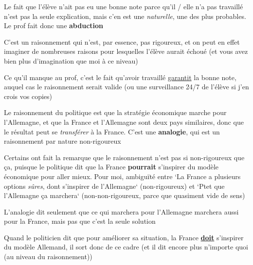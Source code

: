 \begin{frame}

Le fait que l'élève n'ait pas eu une bonne note parce qu'il / elle n'a pas travaillé n'est pas la seule explication, mais c'en est une \textit{naturelle}, une des plus probables. \pause Le prof fait donc une \textbf{abduction}\pause\newline

C'est un raisonnement qui n'est, par essence, pas rigoureux, et on peut en effet imaginer de nombreuses raisons pour lesquelles l'élève aurait échoué (et vous avez bien plus d'imagination que moi à ce niveau)\pause\newline

Ce qu'il manque au prof, c'est le fait qu'avoir travaillé \underline{garantit} la bonne note, auquel cas le raisonnement serait valide \pause (ou une surveillance 24/7 de l'élève si j'en crois vos copies)
\end{frame}

\begin{frame}

Le raisonnement du politique est que la stratégie économique marche pour l'Allemagne, et que la France et l'Allemagne sont deux pays similaires, donc que le résultat peut se \textit{transférer} à la France. \pause C'est une \textbf{analogie}, qui est un raisonnement par nature non-rigoureux\pause\newline

Certains ont fait la remarque que le raisonnement n'est pas si non-rigoureux que ça, puisque le politique dit que la France \textbf{pourrait} s'inspirer du modèle économique pour aller mieux. \pause Pour moi, ambiguïté entre `La France a plusieurs options \textit{sûres}, dont s'inspirer de l'Allemagne` (non-rigoureux) et `Ptet que l'Allemagne ça marchera` (non-non-rigoureux, parce que quasiment vide de sens)

\end{frame}

\begin{frame}

L'analogie dit seulement que ce qui marchera pour l'Allemagne marchera aussi pour la France, mais pas que c'est la seule solution\pause\newline

Quand le politicien dit que pour améliorer sa situation, la France \textbf{\underline{doit}} s'inspirer du modèle Allemand, il sort donc de ce cadre (et il dit encore plus n'importe quoi (au niveau du raisonnement))

\end{frame}

